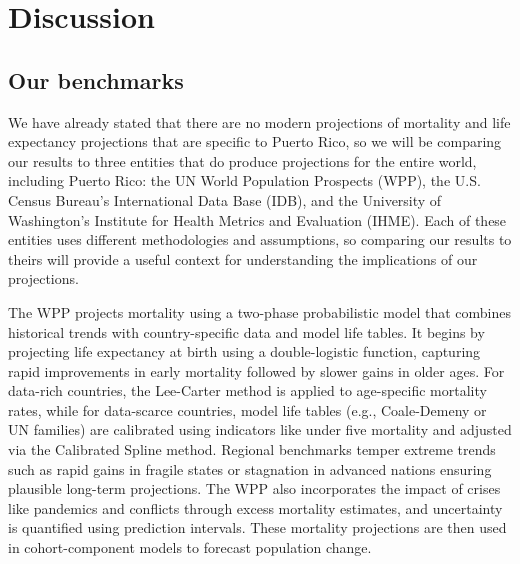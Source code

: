 \documentclass[
  12pt,
]{report}
\begin{document}
\chapter{Discussion}\label{discussion}

\section{Our benchmarks}\label{our-benchmarks}

We have already stated that there are no modern projections of mortality
and life expectancy projections that are specific to Puerto Rico, so we
will be comparing our results to three entities that do produce
projections for the entire world, including Puerto Rico: the UN World
Population Prospects (WPP), the U.S. Census Bureau's International Data
Base (IDB), and the University of Washington's Institute for Health
Metrics and Evaluation (IHME). Each of these entities uses different
methodologies and assumptions, so comparing our results to theirs will
provide a useful context for understanding the implications of our
projections.

The WPP projects mortality using a two-phase probabilistic model that
combines historical trends with country-specific data and model life
tables. It begins by projecting life expectancy at birth using a
double-logistic function, capturing rapid improvements in early
mortality followed by slower gains in older ages. For data-rich
countries, the Lee-Carter method is applied to age-specific mortality
rates, while for data-scarce countries, model life tables (e.g.,
Coale-Demeny or UN families) are calibrated using indicators like under
five mortality and adjusted via the Calibrated Spline method. Regional
benchmarks temper extreme trends such as rapid gains in fragile states
or stagnation in advanced nations ensuring plausible long-term
projections. The WPP also incorporates the impact of crises like
pandemics and conflicts through excess mortality estimates, and
uncertainty is quantified using prediction intervals. These mortality
projections are then used in cohort-component models to forecast
population change.
\end{document}
